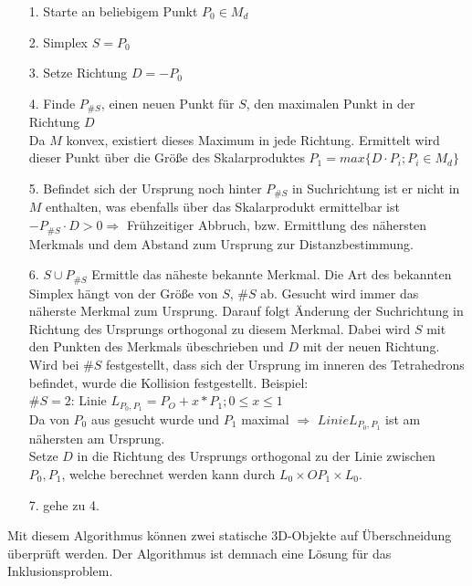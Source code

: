 \begin{itemize}
	\item[1.] Starte an beliebigem Punkt $P_0 \in M_d$
	\item[2.] Simplex $S = {P_0}$
	\item[3.] Setze Richtung $D = -P_0$
	\item[4.] Finde $P_{\#S}$, einen neuen Punkt für $S$, den maximalen Punkt in der Richtung $D$\\
		Da $M$ konvex, existiert dieses Maximum in jede Richtung. Ermittelt wird dieser Punkt über die Größe des Skalarproduktes $P_1 = max\{D \cdot P_i ; P_i \in M_d\}$
	\item[5.] Befindet sich der Ursprung noch hinter $P_{\#S}$ in Suchrichtung ist er nicht in $M$ enthalten, was ebenfalls über das Skalarprodukt ermittelbar ist $-P_{\#S} \cdot D > 0 \Rightarrow$ Frühzeitiger Abbruch, bzw. Ermittlung des nähersten Merkmals und dem Abstand zum Ursprung zur Distanzbestimmung.
	\item[6.] $S \cup {P_{\#S}}$ Ermittle das näheste bekannte Merkmal. Die Art des bekannten Simplex hängt von der Größe von $S$, $\#S$ ab.
		Gesucht wird immer das näherste Merkmal zum Ursprung. Darauf folgt Änderung der Suchrichtung in Richtung des Ursprungs orthogonal zu diesem Merkmal.
		Dabei wird $S$ mit den Punkten des Merkmals übeschrieben und $D$ mit der neuen Richtung.
		Wird bei $\#S$ festgestellt, dass sich der Ursprung im inneren des Tetrahedrons befindet, wurde die Kollision festgestellt.
		Beispiel:\\
			$\#S=2$: Linie $L_{P_0,P_1} = {P_O + x * P_1; 0\le x\le 1}$\\
				Da von $P_0$ aus gesucht wurde und $P_1$ maximal $\Rightarrow$ $Linie L_{P_0,P_1}$ ist am nähersten am Ursprung.\\
				Setze $D$ in die Richtung des Ursprungs orthogonal zu der Linie zwischen $ P_0, P_1 $, welche berechnet werden kann durch $L_0 \times OP_1 \times L_0$.
	\item[7.] gehe zu 4.
\end{itemize}
Mit diesem Algorithmus können zwei statische 3D-Objekte auf Überschneidung überprüft werden. Der Algorithmus ist demnach eine Lösung für das Inklusionsproblem.\\


